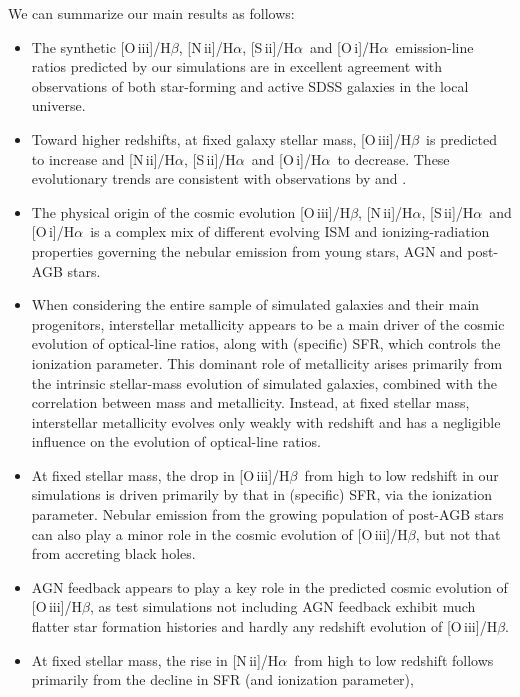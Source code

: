 \documentclass[fleqn,usenatbib]{mnras}
\newcommand{\oiiihb}{\hbox{[O\,{\sc iii}]/H$\beta$}}
\newcommand{\niiha}{\hbox{[N\,{\sc ii}]/H$\alpha$}}
\newcommand{\siiha}{\hbox{[S\,{\sc ii}]/H$\alpha$}}
\newcommand{\oiha}{\hbox{[O\,{\sc i}]/H$\alpha$}}
\begin{document}
We can summarize our main results as follows:\vspace{-0.2cm}
%
\begin{itemize}
\item The synthetic  \oiiihb, \niiha, \siiha\ and \oiha\ emission-line ratios 
predicted by our simulations are in excellent agreement with observations 
of both star-forming and active SDSS galaxies in the local universe.
\item Toward higher redshifts, at fixed galaxy stellar mass, \oiiihb\ is 
predicted to increase and \niiha, \siiha\ and \oiha\ to decrease. These
evolutionary trends are consistent with observations by \citet{Yabe12}
and \citet{Steidel14}.
\item The physical origin of the cosmic evolution \oiiihb, \niiha, \siiha\
and \oiha\ is a complex mix of different evolving ISM and ionizing-radiation 
properties governing the nebular emission from young stars, AGN and 
post-AGB stars. 
\item When considering the entire sample of simulated galaxies and 
their main progenitors, interstellar metallicity appears to be a main driver
of the cosmic evolution of optical-line ratios, along with (specific) SFR,
which controls the ionization parameter. This dominant role of metallicity
arises primarily from the intrinsic stellar-mass evolution of simulated galaxies,
combined with the correlation between mass and metallicity.
Instead, at fixed stellar mass, interstellar metallicity evolves only weakly with 
redshift and has a negligible influence on the evolution of optical-line
ratios.
\item At fixed stellar mass, the drop in \oiiihb\ from high to low redshift 
in our simulations is driven primarily by that in (specific) SFR, via the ionization
parameter. Nebular emission from the growing population of post-AGB
stars can also play a minor role in the cosmic evolution of \oiiihb, but not 
that from accreting black holes.
\item	AGN feedback appears to play a key role in the predicted cosmic
evolution of \oiiihb, as test simulations not including AGN feedback 
exhibit much flatter star formation histories and hardly any redshift 
evolution of \oiiihb.
\item At fixed stellar mass, the rise in \niiha\ from high to low redshift
follows primarily from the decline in SFR (and ionization parameter),

\end{itemize}
\end{document}
